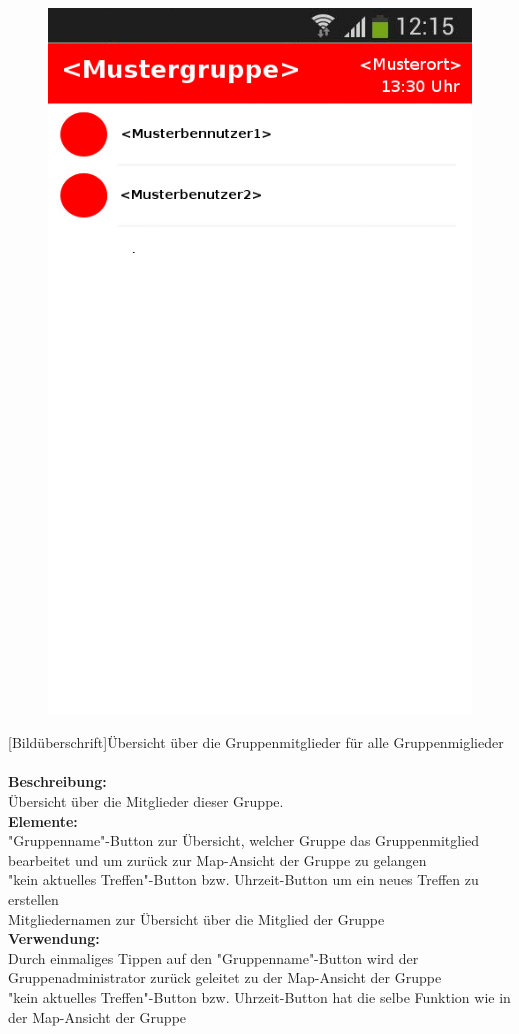 \begin{figure}
	\includegraphics[scale =1]{resources/images/gruppendetails.png}
\end{figure}
[Bildüberschrift]Übersicht über die Gruppenmitglieder für alle Gruppenmiglieder\\ \\
\textbf{Beschreibung:}\\
Übersicht über die Mitglieder dieser Gruppe.\\
\textbf{Elemente:}\\
"Gruppenname"-Button zur Übersicht, welcher Gruppe das Gruppenmitglied  bearbeitet und um zurück zur Map-Ansicht der Gruppe zu gelangen\\
"kein aktuelles Treffen"-Button bzw. Uhrzeit-Button um ein neues Treffen zu erstellen\\
Mitgliedernamen zur Übersicht über die Mitglied der Gruppe\\
\textbf{Verwendung:}\\
Durch einmaliges Tippen auf den "Gruppenname"-Button wird der Gruppenadministrator zurück geleitet zu der Map-Ansicht der Gruppe\\
"kein aktuelles Treffen"-Button bzw. Uhrzeit-Button hat die selbe Funktion wie in der Map-Ansicht der Gruppe\\

